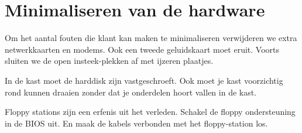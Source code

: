 \section{Minimaliseren van de hardware}
Om het aantal fouten die klant kan maken te minimaliseren verwijderen we extra netwerkkaarten en modems. Ook een tweede geluidskaart moet eruit. Voorts sluiten we de open insteek-plekken af met ijzeren plaatjes.

In de kast moet de harddisk zijn vastgeschroeft.
Ook moet je kast voorzichtig rond kunnen draaien zonder dat je onderdelen hoort vallen in de kast. 

Floppy stations zijn een erfenis uit het verleden. Schakel de floppy ondersteuning in de BIOS uit. En maak de kabels verbonden met het floppy-station los.


